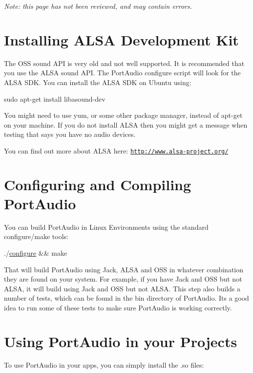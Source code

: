 {\itshape Note\+: this page has not been reviewed, and may contain errors.}\hypertarget{compile_linux_comp_linux1}{}\section{Installing A\+L\+S\+A Development Kit}\label{compile_linux_comp_linux1}
The O\+SS sound A\+PI is very old and not well supported. It is recommended that you use the A\+L\+SA sound A\+PI. The Port\+Audio configure script will look for the A\+L\+SA S\+DK. You can install the A\+L\+SA S\+DK on Ubuntu using\+:


\begin{DoxyCode}
sudo apt-\textcolor{keyword}{get} install libasound-dev
\end{DoxyCode}


You might need to use yum, or some other package manager, instead of apt-\/get on your machine. If you do not install A\+L\+SA then you might get a message when testing that says you have no audio devices.

You can find out more about A\+L\+SA here\+: \href{http://www.alsa-project.org/}{\tt http\+://www.\+alsa-\/project.\+org/}\hypertarget{compile_linux_comp_linux2}{}\section{Configuring and Compiling Port\+Audio}\label{compile_linux_comp_linux2}
You can build Port\+Audio in Linux Environments using the standard configure/make tools\+:


\begin{DoxyCode}
./\hyperlink{namespacewaflib_1_1extras_1_1autowaf_aed9c0237757b6bbcc7a442d726e82c47}{configure} && make
\end{DoxyCode}


That will build Port\+Audio using Jack, A\+L\+SA and O\+SS in whatever combination they are found on your system. For example, if you have Jack and O\+SS but not A\+L\+SA, it will build using Jack and O\+SS but not A\+L\+SA. This step also builds a number of tests, which can be found in the bin directory of Port\+Audio. It\textquotesingle{}s a good idea to run some of these tests to make sure Port\+Audio is working correctly.\hypertarget{compile_linux_comp_linux3}{}\section{Using Port\+Audio in your Projects}\label{compile_linux_comp_linux3}
To use Port\+Audio in your apps, you can simply install the .so files\+:


